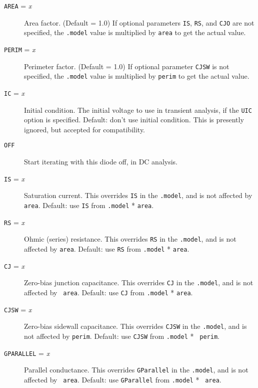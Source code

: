 \begin{description}
  
\item[{\tt AREA} = {\it x}] Area factor.  (Default = 1.0) If optional
  parameters {\tt IS}, {\tt RS}, and {\tt CJO} are not specified, the
  {\tt .model} value is multiplied by {\tt area} to get the actual
  value.
  
\item[{\tt PERIM} = {\it x}] Perimeter factor.  (Default = 1.0) If
  optional parameter {\tt CJSW} is not specified, the {\tt .model}
  value is multiplied by {\tt perim} to get the actual value.
  
\item[{\tt IC} = {\it x}] Initial condition.  The initial voltage to
  use in transient analysis, if the {\tt UIC} option is specified.
  Default: don't use initial condition.  This is presently ignored,
  but accepted for compatibility.
  
\item[{\tt OFF}] Start iterating with this diode off, in DC analysis.
  
\item[{\tt IS} = {\it x}] Saturation current.  This overrides {\tt IS}
  in the {\tt .model}, and is not affected by {\tt area}.  Default:
  use {\tt IS} from {\tt .model} * {\tt area}.
  
\item[{\tt RS} = {\it x}] Ohmic (series) resistance.  This overrides
  {\tt RS} in the {\tt .model}, and is not affected by {\tt area}.
  Default: use {\tt RS} from {\tt .model} * {\tt area}.
  
\item[{\tt CJ} = {\it x}] Zero-bias junction capacitance.  This
  overrides {\tt CJ} in the {\tt .model}, and is not affected by {\tt
    area}.  Default: use {\tt CJ} from {\tt .model} * {\tt area}.
  
\item[{\tt CJSW} = {\it x}] Zero-bias sidewall capacitance.  This
  overrides {\tt CJSW} in the {\tt .model}, and is not affected by
  {\tt perim}.  Default: use {\tt CJSW} from {\tt .model} * {\tt
    perim}.
  
\item[{\tt GPARALLEL} = {\it x}] Parallel conductance.  This overrides
  {\tt GParallel} in the {\tt .model}, and is not affected by {\tt
    area}.  Default: use {\tt GParallel} from {\tt .model} * {\tt
    area}.

\end{description}

